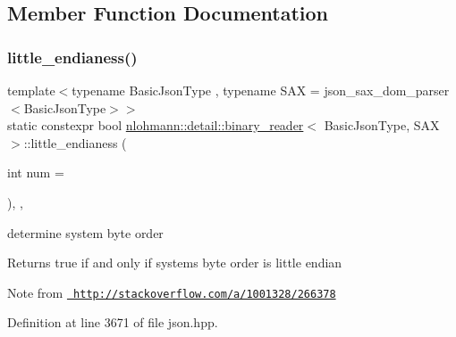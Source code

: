 \subsection{Member Function Documentation}
\mbox{\label{classnlohmann_1_1detail_1_1binary__reader_a1e31dbfcf9567c8c2d4f0e4eb1b0230a}} 
\subsubsection{\texorpdfstring{little\_endianess()}{little\_endianess()}}
{\footnotesize\ttfamily template$<$typename Basic\+Json\+Type , typename S\+AX  = json\+\_\+sax\+\_\+dom\+\_\+parser$<$\+Basic\+Json\+Type$>$$>$ \\
static constexpr bool \mbox{\hyperlink{classnlohmann_1_1detail_1_1binary__reader}{nlohmann\+::detail\+::binary\+\_\+reader}}$<$ Basic\+Json\+Type, S\+AX $>$\+::little\+\_\+endianess (\begin{DoxyParamCaption}\item[{int}]{num = {} }\end{DoxyParamCaption})\hspace{0.3cm}{\ttfamily [inline]}, {\ttfamily [static]}, {\ttfamily [noexcept]}}



determine system byte order 

\begin{DoxyReturn}{Returns}
true if and only if system\textquotesingle{}s byte order is little endian
\end{DoxyReturn}
\begin{DoxyNote}{Note}
from \href{http://stackoverflow.com/a/1001328/266378}{\texttt{ http\+://stackoverflow.\+com/a/1001328/266378}} 
\end{DoxyNote}


Definition at line 3671 of file json.\+hpp.

\mbox{\label{classnlohmann_1_1detail_1_1binary__reader_a87826b833ee7fec146c97233bb0f6ab8}} 
